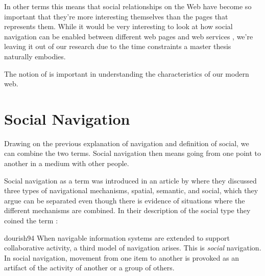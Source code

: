 In other terms this means that social relationships on the Web have become so
important that they're more interesting themselves than the pages that
represents them. While it would be very interesting to look at how
social navigation can be enabled between
different web pages and web services%
,
we're leaving it out of our research due to the time constraints a master
thesis naturally embodies.


The notion of  is important in understanding
the characteristics of our modern web.




\section{Social Navigation}
\label{section:background.social.navigation}
Drawing on the previous explanation of navigation and definition of social, we
can combine the two terms. Social navigation then means going from one point
to another in a medium with other people.

Social navigation as a term was introduced in an article by
\citet{dourish94} where they discussed three types of navigational mechanisms,
spatial, semantic, and social, which they argue can be separated even though
there is evidence of situations where the different mechanisms are combined.
In their description of the social type they coined the term
:

\begin{citequote}[p.~1]{dourish94}
  When navigable information systems are extended to support collaborative
  activity, a third model of navigation arises. This is \emph{social}
  navigation. In social navigation, movement from one item to another is
  provoked as an artifact of the activity of another or a group of others.
\end{citequote}

